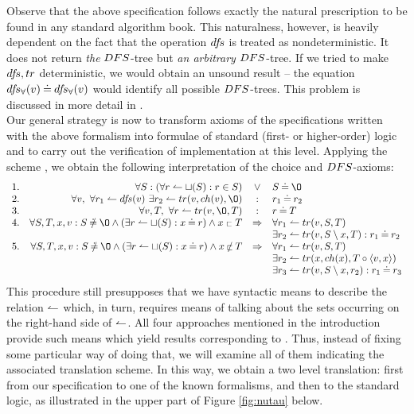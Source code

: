 Observe that the above specification follows exactly the natural prescription to be found in any standard algorithm book. This naturalness, however, is heavily dependent on the fact that the operation $df\!s$ is treated as nondeterministic. It does not return {\em the} $DFS$-tree but {\em an arbitrary} $DFS$-tree. If we tried to make $df\!s, tr$ deterministic, we would obtain an unsound result -- the 
equation $df\!s_\forall(v)\mathbin{\doteq} df\!s_\forall(v)$ would identify
all possible $DFS$-trees. This problem is discussed in more detail in \cite{adt}. \\[2ex]
Our general strategy is now to transform axioms of the specifications written 
with the above formalism into
formulae of standard (first- or higher-order) logic and to carry out the 
verification of implementation at this level.
Applying the scheme , we obtain the following interpretation of the choice and $DFS$-axioms:
\begin{equation} \label{eqTrans}
\begin{array}{rrcl}
1.& \forall S: (\forall r\isres \ch(S) : r \in S)& \lor& S\Eq\es\\ 2.& \forall v,\ \forall r_1\isres \dfs(v)\ \exists r_2\isres tr(v,ch(v),\es) & :
& r_1 \Eq r_2 \\
3.& \forall v,T,\ \forall r\isres tr(v,\es,T)& : & r\Eq T \\ 4.& \forall S,T,x,v: S\Not\Eq\es\land (\exists r\isres\ch(S):x\Eq r) 
\land x\lin T & \impl
& \forall r_1\isres tr(v,S,T)\\
& & &\exists r_2\isres tr(v,S\setminus x,T): r_1\Eq r_2 \\ 5.& \forall S,T,x,v : S\Not\Eq\es\land (\exists r\isres\ch(S):x\Eq r) 
\land x\Not\lin T & \impl
& \forall r_1\isres tr(v,S,T)\\
& & & \exists r_2\isres tr(x,ch(x),T\ap\<v,x\>)\\ & & & \exists r_3\isres tr(v,S\setminus x,r_2): r_1\Eq r_3 \end{array}
\end{equation} 
This procedure still presupposes that
we have syntactic means to describe the relation $\leftharpoonup$ which, in turn, requires means of talking about the sets occurring on the right-hand side of $\leftharpoonup$.
All four approaches mentioned in the introduction provide such means which
yield results corresponding to . 
Thus, instead of fixing some particular way of doing that, we will examine all of them indicating the associated translation scheme. In this way, we obtain a two level translation: first from our specification to one of the known formalisms, and then to the standard logic, as illustrated in the upper part of Figure \ref{fig:nutau} below. 
